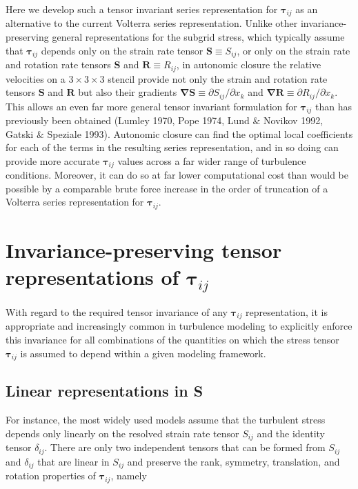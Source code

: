 Here we develop such a tensor invariant series representation for $\mathbf{\tau}_{ij}$   as an alternative to the current Volterra series representation. Unlike other invariance-preserving general representations for the subgrid stress, which typically assume that $\mathbf{\tau}_{ij}$  depends only on the strain rate tensor  $\mathbf{S} \equiv {S}_{ij}$, or only on the strain rate and rotation rate tensors  $\mathbf{S}$ and $\mathbf{R} \equiv {R}_{ij}$, in autonomic closure the relative velocities on a $3 \times 3 \times 3$  stencil provide not only the strain and rotation rate tensors $\mathbf{S}$ and $\mathbf{R}$ but also their gradients  $\mathbf{\nabla S} \equiv \partial S_{ij}/ \partial x_k$ and $\mathbf{\nabla R} \equiv \partial R_{ij}/ \partial x_k$. This allows an even far more general tensor invariant formulation for $\mathbf{\tau}_{ij}$  than has previously been obtained (Lumley 1970, Pope 1974, Lund $\&$ Novikov 1992, Gatski $\&$ Speziale 1993). Autonomic closure can find the optimal local coefficients for each of the terms in the resulting series representation, and in so doing can provide more accurate $\mathbf{\tau}_{ij}$  values across a far wider range of turbulence conditions.  Moreover, it can do so at far lower computational cost than would be possible by a comparable brute force increase in the order of truncation of a Volterra series representation for $\mathbf{\tau}_{ij}$.

\section{Invariance-preserving tensor representations of $\mathbf{\tau}_{ij}$ } 

With regard to the required tensor invariance of any $\mathbf{\tau}_{ij}$  representation, it is appropriate and increasingly common in turbulence modeling to explicitly enforce this invariance for all combinations of the quantities on which the stress tensor  $\mathbf{\tau}_{ij}$ is assumed to depend within a given modeling framework.  

\subsection{Linear representations in S} 

For instance, the most widely used models assume that the turbulent stress depends only linearly on the resolved strain rate tensor $S_{ij}$  and the identity tensor $\delta_{ij}$. There are only two independent tensors that can be formed from  $S_{ij}$ and  $\delta_{ij}$ that are linear in  $S_{ij}$ and preserve the rank, symmetry, translation, and rotation properties of $\mathbf{\tau}_{ij}$, namely


